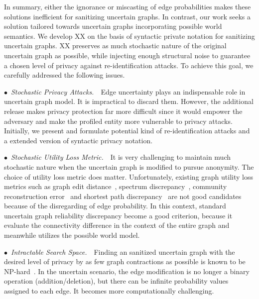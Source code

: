In summary, either the ignorance or miscasting of edge probabilities makes these solutions inefficient for sanitizing uncertain graphs. In contrast, our work seeks a solution tailored towards uncertain graphs incorporating possible world semantics. We develop XX on the basis of syntactic private notation for sanitizing uncertain graphs. XX preserves as much stochastic nature of the original uncertain graph as possible, while injecting enough structural noise to guarantee a chosen level of privacy against re-identification attacks. To achieve this goal, we carefully addressed the following issues. 

$\bullet$~\textup{\emph{Stochastic Privacy Attacks.}}~~Edge uncertainty plays an indispensable
 role in uncertain graph model. It is impractical to discard them.  However, the additional release makes privacy protection far more difficult since it would empower the adversary and make the profiled entity more vulnerable to privacy attacks. Initially, we present and formulate potential kind of re-identification attacks and a extended version of syntactic privacy notation.

$\bullet$~\textup{\emph{Stochastic Utility Loss Metric.}}~~It is very challenging to maintain much stochastic nature when the uncertain graph is modified to pursue anonymity. The choice of utility loss metric does matter. Unfortunately, existing graph utility loss metrics such as graph edit distance~\cite{Liu_Towards_2008}, spectrum discrepancy~\cite{Ying_Randomizing_2008}, community reconstruction error~\cite{Wang2011} and shortest path discrepancy~\cite{Liu_Privacy_2009} are not good candidates because of the disregarding of edge probability. In this context, standard uncertain graph reliability 
discrepancy become a good criterion, because it evaluate the connectivity difference in the context of the entire graph and meanwhile utilizes the possible world model. 

$\bullet$~\textup{\emph{Intractable Search Space.}}~~Finding an sanitized uncertain graph with the desired level of privacy by as few graph contractions as possible is known to be NP-hard~\cite{Hartung_Theory_2015}. In the uncertain scenario, the edge modification is no longer a binary operation (addition/deletion), but there can be infinite probability values assigned to each edge. It becomes more computationally challenging.  




